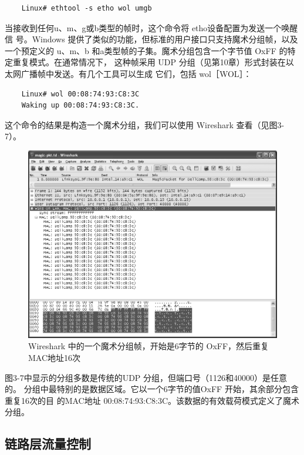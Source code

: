 \begin{verbatim}
    Linux# ethtool -s etho wol umgb
\end{verbatim}

当接收到任何u、m、g或b类型的帧时，这个命令将 etho设备配置为发送一个唤醒信
号。Windows 提供了类似的功能，但标准的用户接口只支持魔术分组帧，以及一个预定义的
u、m、b 和a类型帧的子集。魔术分组包含一个字节值 OxFF 的特定重复模式。在通常情况下，
这种帧采用 UDP 分组（见第10章）形式封装在以太网广播帧中发送。有几个工具可以生成
它们，包括 wol［WOL］：

\begin{verbatim}
    Linux# wol 00:08:74:93:C8:3C
    Waking up 00:08:74:93:C8:3C.
\end{verbatim}

这个命令的结果是构造一个魔术分组，我们可以使用 Wireshark 查看（见图3-7）。

\begin{figure}
    \centering
    \includegraphics[scale=0.5]{imgs/3/3-7.png}
    \caption{Wireshark 中的一个魔术分组帧，开始是6字节的 OxFF，然后重复 MAC地址16次}
\end{figure}

图3-7中显示的分组多数是传统的UDP 分组，但端口号（1126和40000）是任意的。
分组中最特别的是数据区域。它以一个6字节的值OxFF 开始，其余部分包含重复16次的目
的MAC地址 00:08:74:93:C8:3C。该数据的有效载荷模式定义了魔术分组。

\subsection{链路层流量控制}

